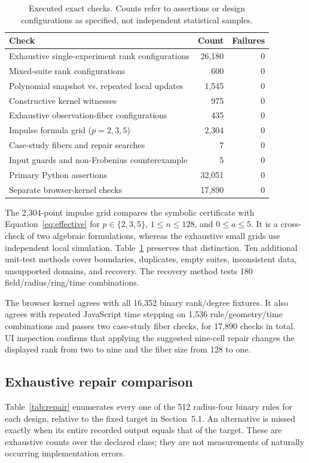 \documentclass[11pt]{article}
\begin{document}
\begin{table}[t]
\centering\small
\caption{Executed exact checks. Counts refer to assertions or design configurations as specified, not independent statistical samples.}
\label{tab:checks}
\begin{tabular}{@{}p{.62\linewidth}rr@{}}
\toprule
Check & Count & Failures\\\midrule
Exhaustive single-experiment rank configurations & 26,180 & 0\\
Mixed-suite rank configurations & 600 & 0\\
Polynomial snapshot vs. repeated local updates & 1,545 & 0\\
Constructive kernel witnesses & 975 & 0\\
Exhaustive observation-fiber configurations & 435 & 0\\
Impulse formula grid ($p=2,3,5$) & 2,304 & 0\\
Case-study fibers and repair searches & 7 & 0\\
Input guards and non-Frobenius counterexample & 5 & 0\\\midrule
Primary Python assertions & 32,051 & 0\\
Separate browser-kernel checks & 17,890 & 0\\\bottomrule
\end{tabular}
\end{table}

The 2,304-point impulse grid compares the symbolic certificate with Equation~\eqref{eq:effective} for $p\in\{2,3,5\}$, $1\leq n\leq128$, and $0\leq a\leq5$. It is a cross-check of two algebraic formulations, whereas the exhaustive small grids use independent local simulation. Table~\ref{tab:checks} preserves that distinction. Ten additional unit-test methods cover boundaries, duplicates, empty suites, inconsistent data, unsupported domains, and recovery. The recovery method tests 180 field/radius/ring/time combinations.

The browser kernel agrees with all 16,352 binary rank/degree fixtures. It also agrees with repeated JavaScript time stepping on 1,536 rule/geometry/time combinations and passes two case-study fiber checks, for 17,890 checks in total. UI inspection confirms that applying the suggested nine-cell repair changes the displayed rank from two to nine and the fiber size from 128 to one.

\subsection{Exhaustive repair comparison}
Table~\ref{tab:repair} enumerates every one of the 512 radius-four binary rules for each design, relative to the fixed target in Section~5.1. An alternative is missed exactly when its entire recorded output equals that of the target. These are exhaustive counts over the declared class; they are not measurements of naturally occurring implementation errors.
\end{document}
